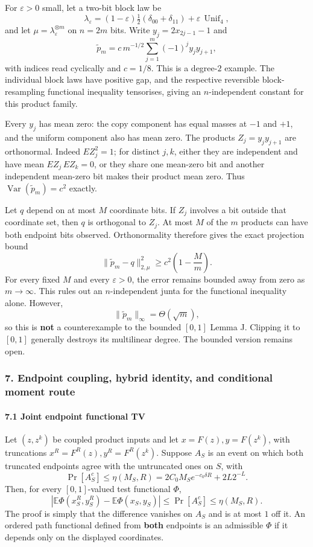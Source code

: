 For \(\varepsilon>0\) small, let a two-bit block law be
\[\lambda_\varepsilon=(1-\varepsilon)\tfrac12(\delta_{00}+\delta_{11})
+\varepsilon\,\operatorname{Unif}_{4},\]
and let \(\mu=\lambda_\varepsilon^{\otimes m}\) on \(n=2m\) bits. Write \(y_j=2x_{2j-1}-1\) and
\[\widetilde p_m=c\,m^{-1/2}\sum_{j=1}^m(-1)^jy_jy_{j+1},\]
with indices read cyclically and \(c=1/8\). This is a degree-\(2\) example. The individual block laws have positive gap, and the respective reversible block-resampling functional inequality tensorises, giving an \(n\)-independent constant for this product family.

Every \(y_j\) has mean zero: the copy component has equal masses at \(-1\) and \(+1\), and the uniform component also has mean zero. The products \(Z_j=y_jy_{j+1}\) are orthonormal. Indeed \(E Z_j^2=1\); for distinct \(j,k\), either they are independent and have mean \(E Z_j\,E Z_k=0\), or they share one mean-zero bit and another independent mean-zero bit makes their product mean zero. Thus \(\operatorname{Var}(\widetilde p_m)=c^2\) exactly.

Let \(q\) depend on at most \(M\) coordinate bits. If \(Z_j\) involves a bit outside that coordinate set, then \(q\) is orthogonal to \(Z_j\). At most \(M\) of the \(m\) products can have both endpoint bits observed. Orthonormality therefore gives the exact projection bound
\[\|\widetilde p_m-q\|_{2,\mu}^2
\ge c^2\left(1-\frac Mm\right).\]
For every fixed \(M\) and every \(\varepsilon>0\), the error remains bounded away from zero as \(m\to\infty\). This rules out an \(n\)-independent junta for the functional inequality alone. However,
\[\|\widetilde p_m\|_\infty=\Theta(\sqrt m),\]
so this is \textbf{not} a counterexample to the bounded \([0,1]\) Lemma J. Clipping it to \([0,1]\) generally destroys its multilinear degree. The bounded version remains open.

\subsubsection{7. Endpoint coupling, hybrid identity, and conditional moment route}\label{endpoint-coupling-hybrid-identity-and-conditional-moment-route}

\paragraph{7.1 Joint endpoint functional TV}\label{joint-endpoint-functional-tv}

Let \((z,z^k)\) be coupled product inputs and let \(x=F(z),y=F(z^k)\), with truncations \(x^R=F^R(z),y^R=F^R(z^k)\). Suppose \(A_S\) is an event on which both truncated endpoints agree with the untruncated ones on \(S\), with
\[\Pr[A_S^c]\le\eta(M_S,R)=2C_0M_Se^{-c_0\delta R}+2L2^{-L}.\]
Then, for every \([0,1]\)-valued test functional \(\Phi\),
\[|\mathbb E\Phi(x_S^R,y_S^R)-\mathbb E\Phi(x_S,y_S)|
\le\Pr[A_S^c]\le\eta(M_S,R).\]
The proof is simply that the difference vanishes on \(A_S\) and is at most \(1\) off it. An ordered path functional defined from \textbf{both} endpoints is an admissible \(\Phi\) if it depends only on the displayed coordinates.

